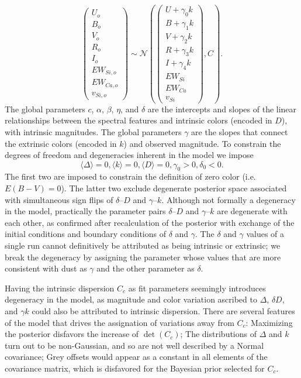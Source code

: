 \documentclass{aastex}   	%
\begin{document}
\begin{equation}
\begin{pmatrix}
U_o\\B_o\\ V_o\\R_o\\I_o\\EW_{Si, o}\\ EW_{Ca, o} \\ v_{Si, o}
\end{pmatrix}
\sim \mathcal{N}
\left(
\begin{pmatrix}
U +\gamma_0 k \\B +\gamma_1 k \\V+\gamma_2 k\\R+\gamma_3 k\\I+\gamma_4 k\\
EW_{Si}\\ EW_{Ca} \\ v_{Si}
\end{pmatrix}
,C
\right).
\label{dust:eqn}
\end{equation}
The global parameters $c$, $\alpha$, $\beta$, $\eta$, and $\delta$  are the intercepts and slopes of the linear relationships between the spectral
features and intrinsic colors (encoded in $D$),  with intrinsic magnitudes.  The global parameters $\gamma$ are the slopes that connect the extrinsic colors
(encoded in $k$) and observed magnitude.  To constrain the degrees of freedom and degeneracies inherent in the model we impose
\begin{equation}
\langle \Delta \rangle=0, \langle k \rangle=0, \langle D \rangle=0, \gamma_0 > 0, \delta_0 < 0.
\end{equation}
The first two are imposed to constrain the definition of zero color (i.e. $E(B-V)=0$).    The latter two exclude degenerate posterior space
associated
with  simultaneous sign flips of
$\delta$--$D$ and $\gamma$--$k$.
Although not formally a degeneracy in the model, practically the parameter pairs  $\delta$--$D$ and $\gamma$--$k$ are degenerate with
each other,
as confirmed after recalculation of the posterior with exchange of the initial conditions and boundary conditions of $\delta$ and $\gamma$.
The $\delta$ and $\gamma$ values of a single run cannot definitively be attributed as being intrinsic or extrinsic; we break the degeneracy
by assigning the parameter whose values that are more consistent with dust as $\gamma$ and the other parameter as $\delta$.


Having the intrinsic dispersion $C_c$ as fit parameters seemingly introduces degeneracy in the model, as magnitude and color variation
ascribed to $\Delta$, $\delta D$, and $\gamma k$ could also be attributed to intrinsic dispersion.  There are several features of the model
that drives the assignation of variations away from $C_c$:  Maximizing the posterior disfavors the increase of $\det{(C_c)}$;
The distributions of $\Delta$ and $k$ turn out to
be non-Gaussian, and so are not well described by a Normal covariance; Grey offsets would appear as a constant
in all elements of the covariance matrix, which is disfavored for the Bayesian prior selected for $C_c$.
\end{document}
